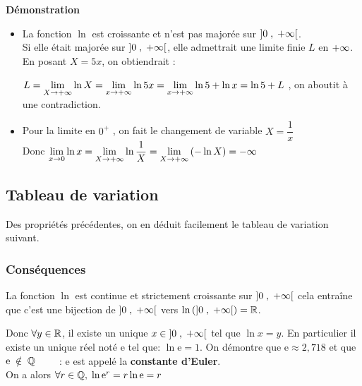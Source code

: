 \textbf{Démonstration}
\begin{itemize}
\item La fonction  $ \ln  $ est croissante et  n'est pas   majorée sur  $ \left]0 \;,\; +\infty\right[ $.\\
 Si elle était majorée sur $ \left]0 \;,\; +\infty\right[ $, elle admettrait une limite finie $L$ en
$ +\infty $. En posant $X = 5x$, on obtiendrait :

$L= \displaystyle\lim_{X \to +\infty} \ln X = \displaystyle\lim_{x \to +\infty} \ln 5x = \displaystyle\lim_{x \to +\infty} \ln 5 + \ln x = \ln 5 + L$ , on aboutit à une contradiction.
\item  Pour la limite en $ 0^{+} $ , on fait le changement de variable $ X=\dfrac{1}{x} $\\
Donc $ \displaystyle\lim_{x \to 0}\ln x=\displaystyle\lim_{X \to +\infty}\ln \dfrac{1}{X}=\displaystyle\lim_{X \to  +\infty}\left(-\ln X\right)=-\infty $
\end{itemize}


\subsection*{Tableau de variation }
Des propriétés précédentes, on en déduit facilement le tableau de variation suivant.

\begin{center}

\end{center}



\subsubsection*{Conséquences}
La fonction $ \ln  $  est continue et strictement croissante sur $ \left]0 \;,\; +\infty\right[ $  cela entraîne que c'est une bijection de $ \left]0 \;,\; +\infty\right[ $  vers $ \ln \left(  \left]0 \;,\; +\infty\right[ \right)=\mathbb{R} $.

Donc $ \forall y \in \mathbb{R} $,  il existe un unique $ x\in \left]0 \;,\; +\infty\right[ $ tel que $ \ln x=y. $  En particulier il existe un unique réel noté $ \mathrm{e} $ tel que:  $\ln \mathrm{e}=1 $.
On démontre que $ \mathrm{e}\approx 2,718 $    et que  $  \mathrm{e}\;\notin\; \mathbb{Q}\qquad$ :  $ \mathrm{e }$ est appelé la  \textbf{ constante d'Euler}.\\
On a alors  $ \forall r \in \mathbb{Q}, \; \ln \mathrm{e}^{r}=r\ln \mathrm{e}=r $


